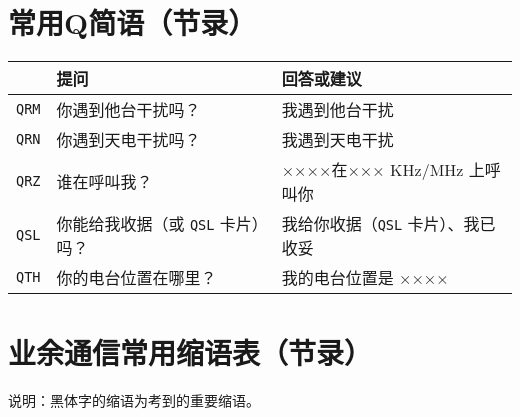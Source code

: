 \newpage

\section{常用Q简语（节录）}

\begin{longtable}{|l|l|l|}
	\hline
	    & \textbf{提问} & \textbf{回答或建议} \\
	\hline
	\texttt{QRM} & 你遇到他台干扰吗？ & 我遇到他台干扰 \\
	\hline
	\texttt{QRN} & 你遇到天电干扰吗？ & 我遇到天电干扰 \\
	\hline
	\texttt{QRZ} & 谁在呼叫我？ &  ××××在××× KHz/\unit{\MHz} 上呼叫你 \\
	\hline
	\texttt{QSL} & 你能给我收据（或 \texttt{QSL} 卡片）吗？ & 我给你收据（\texttt{QSL} 卡片）、我已收妥 \\
	\hline
	\texttt{QTH} & 你的电台位置在哪里？ & 我的电台位置是 ×××× \\
	\hline
\end{longtable}

\newpage



\section{业余通信常用缩语表（节录）}

说明：黑体字的缩语为考到的重要缩语。


